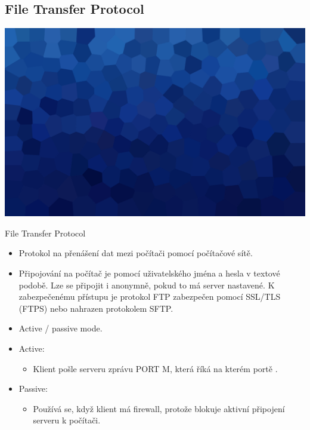 \documentclass[aspectratio=169,xcolor=dvipsnames, t]{beamer}
\begin{document}
\subsection{File Transfer Protocol}
{
    \includegraphics[width=\paperwidth,height=\paperheight]{AICStyleData/logos/mene_polygonu_bg.png}
}
\begin{frame}{File Transfer Protocol}
    \begin{itemize}
        \item Protokol na přenášení dat mezi počítači pomocí počítačové sítě.
        \item Připojování na počítač je pomocí uživatelského jména a hesla v textové podobě. Lze se připojit i anonymně, pokud to má server nastavené. K zabezpečenému přístupu je protokol FTP zabezpečen pomocí SSL/TLS (FTPS) nebo nahrazen protokolem SFTP. 
        \item Active / passive mode.
        \item Active:
        \begin{itemize}
            \item Klient pošle serveru zprávu PORT M, která říká na kterém portě . 
        \end{itemize}
        \item Passive:
        \begin{itemize}
            \item Používá se, když klient má firewall, protože blokuje aktivní připojení serveru k počítači. 
        \end{itemize}
    \end{itemize}
\end{frame}
\end{document}
